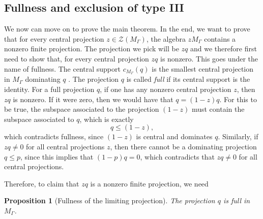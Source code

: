 \documentclass[aps,pra,reprint,superscriptaddress]{revtex4-2}
\newcommand{\cZ}{{\mathcal Z}}
\newcommand\G{\Gamma}
\newtheorem{proposition}[theorem]{Proposition}
\theoremstyle{definition}
\theoremstyle{remark}
\begin{document}
\subsection{Fullness and exclusion of type III}
We now can move on to prove the main theorem. In the end, we want to
prove that for every central projection $z \in \cZ(M_\G)$, the algebra $zM_\G$ contains a nonzero finite projection. The projection we pick will be $zq$
and we therefore first need to show that, for every central projection $zq$ is
nonzero. This goes under the name of fullness.
The central support $c_{M_\G}(q)$ is the smallest central projection in
$M_\G$ dominating $q$ \cite[III.1.1.5]{Blackadar}.
The projection $q$ is called \emph{full} if its central support is the identity.
For a full projection $q$, if one has any nonzero central projection $z$, then $zq$ is
nonzero. If it were zero, then we would have that $q = (1-z)q$. For this to be
true, the
subspace associated to the projection $(1-z)$ must contain the subspace associated
to $q$, which is exactly
\begin{equation}
    q \leq (1-z),
\end{equation}
which contradicts fullness, since $(1-z)$ is central and dominates $q$.
Similarly, if $zq \neq 0$ for all central projections $z$, then there cannot be
a dominating projection $q \leq p$, since this implies that $(1-p)q = 0$, which
contradicts that $zq \neq 0$ for all central projections. 

Therefore, to claim that $zq$ is a nonzero finite projection, we need
\begin{proposition}[Fullness of the limiting projection]\label{prop:fullness}
The projection $q$ is full in $M_\G$.
\end{proposition}
\end{document}
